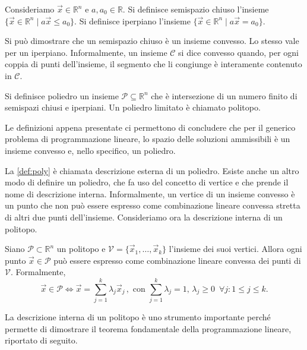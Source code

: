 \begin{definition}
    Consideriamo $\vec{x} \in \mathbb{R}^n$ e $a, a_{0} \in \mathbb{R}$. Si
    definisce semispazio chiuso l'insieme
    \(
        \{ \vec{x} \in \mathbb{R}^n \mid a\vec{x} \le a_{0}\}.
    \)
    Si definisce iperpiano l'insieme
    \(
        \{ \vec{x} \in \mathbb{R}^n \mid a\vec{x} = a_{0}\}.
    \)
\end{definition}
Si può dimostrare che un semispazio chiuso è un insieme convesso. Lo stesso
vale per un iperpiano.  Informalmente, un insieme $\mathcal{C}$ si dice
convesso quando, per ogni coppia di punti dell'insieme, il segmento che li
congiunge è interamente contenuto in $\mathcal{C}$.
\begin{definition}\label{def:poly}
    Si definisce poliedro un insieme $\mathcal{P} \subseteq \mathbb{R}^n$
    che è intersezione di un numero finito di semispazi chiusi e iperpiani.
    Un poliedro limitato è chiamato politopo.
\end{definition}
Le definizioni appena presentate ci permettono di concludere che per il
generico problema di programmazione lineare, lo spazio delle soluzioni
ammissibili è un insieme convesso e, nello specifico, un poliedro.

La \cref{def:poly} è chiamata descrizione esterna di un poliedro. Esiste
anche un altro modo di definire un poliedro, che fa uso del concetto di
vertice e che prende il nome di descrizione interna. Informalmente, un
vertice di un insieme convesso è un punto che non può essere espresso come
combinazione lineare convessa stretta di altri due punti dell'insieme.
Consideriamo ora la descrizione interna di un politopo.


\begin{theorem}
    Siano $\mathcal{P} \subset \mathbb{R}^n$ un politopo e
    $\mathcal{V} = \{ \vec{x}_1, \ldots, \vec{x}_k\}$ l'insieme dei suoi
    vertici. Allora ogni punto $\vec{x} \in \mathcal{P}$ può essere
    espresso come combinazione lineare convessa dei punti di $\mathcal{V}$.
    Formalmente,
    \[
        \vec{x} \in \mathcal{P} \iff
            \vec{x} = \sum_{j=1}^{k} \lambda_j \vec{x}_j\,, \text{ con }
            \sum_{j=1}^{k} \lambda_j = 1,\,
            \lambda_j \ge 0 \,\,\, \forall j\colon 1 \le j \le k.
    \]
\end{theorem}
La descrizione interna di un politopo è uno strumento importante perché
permette di dimostrare il teorema fondamentale della programmazione
lineare, riportato di seguito.

